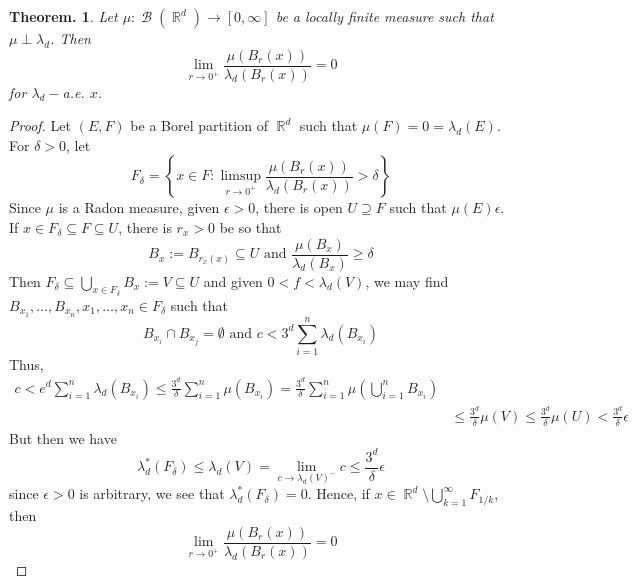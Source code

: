 \documentclass[11pt, a4paper]{memoir}
\DeclareMathOperator{\R}{{\mathbb{R}}}
\theoremstyle{change}
\newtheorem{theorem}{Theorem.}[section]
\theoremstyle{plain}
\theoremstyle{nonumberplain}
\newtheorem{proof}{Proof}
\DeclareMathOperator{\B}{{\mathcal{B}}}
\numberwithin{equation}{section}
\begin{document}
\begin{theorem}
    Let $\mu:\B(\R^d)\to[0,\infty]$ be a locally finite measure such that $\mu\perp\lambda_d$.
    Then
    \begin{equation*}
        \lim_{r\to 0^+}\frac{\mu(B_r(x))}{\lambda_d(B_r(x))}=0
    \end{equation*}
    for $\lambda_d-$a.e. $x$.
\end{theorem}
\begin{proof}
    Let $(E,F)$ be a Borel partition of $\R^d$ such that $\mu(F)=0=\lambda_d(E)$.
    For $\delta>0$, let
    \begin{equation*}
        F_\delta=\left\{x\in F:\limsup_{r\to 0^+}\frac{\mu(B_r(x))}{\lambda_d(B_r(x))}>\delta\right\}
    \end{equation*}
    Since $\mu$ is a Radon measure, given $\epsilon>0$, there is open $U\supseteq F$ such that $\mu(E)\epsilon$.
    If $x\in F_\delta\subseteq F\subseteq U$, there is $r_x>0$ be so that
    \begin{equation*}
        B_x:=B_{r_x(x)}\subseteq U\text{ and }\frac{\mu(B_x)}{\lambda_d(B_x)}\geq\delta
    \end{equation*}
    Then $F_\delta\subseteq\bigcup_{x\in F_\delta}B_x:=V\subseteq U$ and given $0<f<\lambda_d(V)$, we may find $B_{x_1},\ldots,B_{x_n},x_1,\ldots,x_n\in F_\delta$ such that
    \begin{equation*}
        B_{x_i}\cap B_{x_j}=\emptyset\text{ and }c<3^d\sum_{i=1}^n \lambda_d(B_{x_i})
    \end{equation*}
    Thus,
    \begin{align*}
        c<e^d\sum_{i=1}^n\lambda_d(B_{x_i})\leq\frac{3^d}{\delta}\sum_{i=1}^n\mu(B_{x_i})=\frac{3^d}{\delta}\sum_{i=1}^n\mu\left(\bigcup_{i=1}^n B_{x_i}\right)\\
        &\leq\frac{3^d}{\delta}\mu(V)\leq\frac{3^d}{\delta}\mu(U)<\frac{3^d}{\delta}\epsilon
    \end{align*}
    But then we have
    \begin{equation*}
        \lambda_d^*(F_\delta)\leq\lambda_d(V)=\lim_{c\to\lambda_d(V)^-}c\leq\frac{3^d}{\delta}\epsilon
    \end{equation*}
    since $\epsilon>0$ is arbitrary, we see that $\lambda_d^*(F_\delta)=0$.
    Hence, if $x\in\R^d\setminus\bigcup_{k=1}^\infty F_{1/k}$, then
    \begin{equation*}
        \lim_{r\to 0^+}\frac{\mu(B_r(x))}{\lambda_d(B_r(x))}=0
    \end{equation*}
\end{proof}
\end{document}
